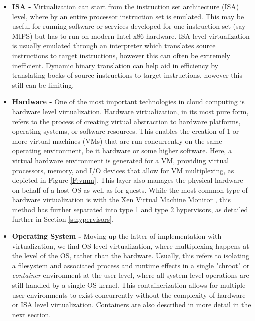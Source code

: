 \begin{itemize}

\item \textbf{ISA - }
Virtualization can start from the instruction set architecture (ISA) level, where by an entire processor instruction set is emulated.  This may be useful for running software or services developed for one instruction set (say MIPS) but has to run on modern Intel x86 hardware. ISA level virtualization is usually emulated through an interpreter which translates source instructions to target instructions, however this can often be extremely inefficient.  Dynamic binary translation can help aid in efficiency by translating bocks of source instructions to target instructions, however this still can be limiting.   

\item \textbf{Hardware - }
One of the most important technologies in cloud computing is hardware level virtualization\cite{Barham2003, ESX}. Hardware virtualization, in its most pure form, refers to the process of creating virtual abstraction to hardware platforms, operating systems, or software resources. This enables the creation of 1 or more virtual machines (VMs) that are run concurrently on the same operating environment, be it hardware or some higher software. Here, a virtual hardware environment is generated for a VM, providing virtual processors, memory, and I/O devices that allow for VM multiplexing, as depicted in Figure \ref{F:vmm}.  This layer also manages the physical hardware on behalf of a host OS as well as for guests. While the most common type of hardware virtualization is with the Xen Virtual Machine Monitor \cite{Barham2003}, this method has further separated into type 1 and type 2 hypervisors, as detailed further in Section \ref{s:hypervisors}.  

\item \textbf{Operating System - }
Moving up the latter of implementation with virtualization, we find OS level virtualization, where multiplexing happens at the level of the OS, rather than the hardware. Usually, this refers to isolating a filesystem and associated process and runtime effects in a single "chroot" or \emph{container} environment at the user level, where all system level operations are still handled by a single OS kernel. This containerization allows for multiple user environments to exist concurrently without the complexity of hardware or ISA level virtualization.  Containers are also described in more detail in the next section. 


\end{itemize}
